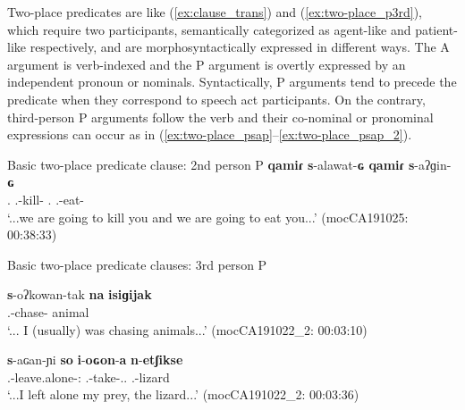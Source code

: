 \documentclass[12pt]{article}
\begin{document}
 Two-place predicates  are like (\ref{ex:clause_trans}) and (\ref{ex:two-place_p3rd}), which require two participants, semantically categorized as agent-like and patient-like respectively, and are morphosyntactically expressed in different ways.  The A argument is verb-indexed and the P argument is overtly expressed  by an independent pronoun or nominals. Syntactically, P arguments tend to precede the predicate when they correspond to speech act participants. On the contrary, third-person P arguments follow the verb and their co-nominal or pronominal expressions can occur as in (\ref{ex:two-place_psap}--\ref{ex:two-place_psap_2}).
 
 \begin{exe}
 \ex  Basic two-place predicate clause: 2nd person P
 \gll \textbf{qamiɾ} \textbf{s}-alawat-\textbf{ɢ} \textbf{qamiɾ} \textbf{s}-aʔɡin-\textbf{ɢ} \\
 {\Second\Sg.\Pron} {\First.\II}-kill-{\Pl} {\Second\Sg.\Pron} {\First.\II}-eat-{\Pl} \\
 \trans ‘...we are going to kill you and we are going to eat you...' \hfill(mocCA191025: 00:38:33) \label{ex:clause_trans}
\end{exe}


\begin{exe}
\ex Basic two-place predicate clauses: 3rd person P \label{ex:two-place_p3rd}
\begin{xlist}
\ex
\gll \textbf{s}-oʔkowan-tak \textbf{na} \textbf{isiɡijak} \\
	{\First.\I}-chase-{\Prog} {\DetThree} animal \\
	\trans `... I (usually) was chasing animals...' \hfill{(mocCA191022\_2: 00:03:10)} \label{ex:two-place_psap}
	
	\ex 
	\gll \textbf{s}-aɢan-ɲi \textbf{so} \textbf{i}-\textbf{oɢon}-\textbf{a}  \textbf{n}-\textbf{etʃikse}\\
	{\First.\I}-leave.alone-{\Dir:\Down} {\DetTwo} {\First\Sg.\Poss}-take-{\Nmlz.\Obj.\F} {\Indet.\Poss}-lizard \\
	\trans `...I left alone my prey, the lizard...' \hfill{(mocCA191022\_2: 00:03:36)} \label{ex:two-place_psap_2}
\end{xlist}
\end{exe}
\end{document}
